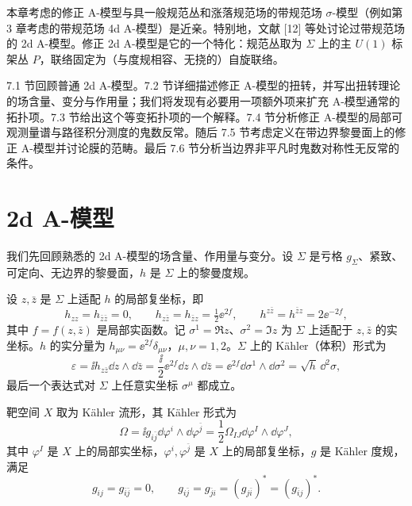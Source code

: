 本章考虑的修正 A-模型与具一般规范丛和涨落规范场的带规范场 $\sigma$-模型（例如第 3 章考虑的带规范场 4d A-模型）是近亲。特别地，文献 [12] 等处讨论过带规范场的 2d A-模型。修正 2d A-模型是它的一个特化：规范丛取为 $\Sigma$ 上的主 $U(1)$ 标架丛 $P$，联络固定为（与度规相容、无挠的）自旋联络。

7.1 节回顾普通 2d A-模型。7.2 节详细描述修正 A-模型的扭转，并写出扭转理论的场含量、变分与作用量；我们将发现有必要用一项额外项来扩充 A-模型通常的拓扑项。7.3 节给出这个等变拓扑项的一个解释。7.4 节分析修正 A-模型的局部可观测量谱与路径积分测度的鬼数反常。随后 7.5 节考虑定义在带边界黎曼面上的修正 A-模型并讨论膜的范畴。最后 7.6 节分析当边界非平凡时鬼数对称性无反常的条件。


\section{2d A-模型}

我们先回顾熟悉的 2d A-模型的场含量、作用量与变分。设 $\Sigma$ 是亏格 $g_\Sigma$、紧致、可定向、无边界的黎曼面，$h$ 是 $\Sigma$ 上的黎曼度规。

设 $z,\bar z$ 是 $\Sigma$ 上适配 $h$ 的局部复坐标，即
\[
h_{zz}=h_{\bar z\bar z}=0,\qquad h_{z\bar z}=h_{\bar z z}=\tfrac12\ee^{2f},\qquad h^{z\bar z}=h^{\bar z z}=2\ee^{-2f},
\]
其中 $f=f(z,\bar z)$ 是局部实函数。记 $\sigma^1=\Re z$、$\sigma^2=\Im z$ 为 $\Sigma$ 上适配于 $z,\bar z$ 的实坐标。$h$ 的实分量为 $h_{\mu\nu}=\ee^{2f}\delta_{\mu\nu}$，$\mu,\nu=1,2$。$\Sigma$ 上的 Kähler（体积）形式为
\[
\varepsilon=\ii h_{z\bar z}\dd z\wedge\dd\bar z=\frac{\ii}{2}\ee^{2f}\dd z\wedge\dd\bar z=\ee^{2f}\dd\sigma^1\wedge\dd\sigma^2=\sqrt{h}\,\dd^2\sigma,
\]
最后一个表达式对 $\Sigma$ 上任意实坐标 $\sigma^\mu$ 都成立。

靶空间 $X$ 取为 Kähler 流形，其 Kähler 形式为
\[
\Omega=\ii g_{i\bar j}\dd\varphi^i\wedge\dd\varphi^{\bar j}=\frac12\Omega_{IJ}\dd\varphi^I\wedge\dd\varphi^J,
\]
其中 $\varphi^I$ 是 $X$ 上的局部实坐标，$\varphi^i,\varphi^{\bar j}$ 是 $X$ 上的局部复坐标，$g$ 是 Kähler 度规，满足
\[
g_{ij}=g_{\bar i\bar j}=0,\qquad g_{i\bar j}=g_{\bar j i}=(g_{j\bar i})^*=(g_{\bar i j})^* .
\]

